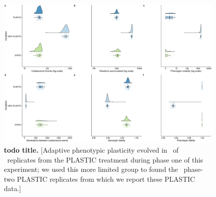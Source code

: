 
\begin{figure}[h!]
    \centering
    \includegraphics[width=1\textwidth]{media/evolutionary-change-full-panel.pdf}
    \caption{\small
    \textbf{todo title.}
    [Adaptive phenotypic plasticity evolved in \evolutionaryChangeRatePlasticReps\ of \evolutionaryChangeRateReplicates\ replicates from the PLASTIC treatment during phase one of this experiment; we used this more limited group to found the \evolutionaryChangeRatePlasticReps\ phase-two PLASTIC replicates from which we report these PLASTIC data.]
    }
    \label{fig:evolutionary-dynamics}
\end{figure}